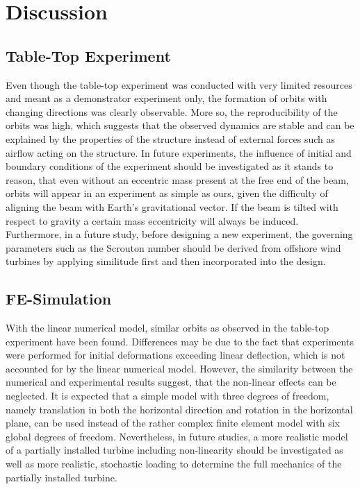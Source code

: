 \documentclass{article}
\begin{document}
\section{Discussion}
\label{sec:discussion}

\subsection{Table-Top Experiment}

Even though the table-top experiment was conducted with very limited resources and meant as a demonstrator experiment only, the formation of orbits with changing directions was clearly observable. More so, the reproducibility of the orbits was high, which suggests that the observed dynamics are stable and can be explained by the properties of the structure instead of external forces such as airflow acting on the structure. In future experiments, the influence of initial and boundary conditions of the experiment should be investigated as it stands to reason, that even without an eccentric mass present at the free end of the beam, orbits will appear in an experiment as simple as ours, given the difficulty of aligning the beam with Earth's gravitational vector. If the beam is tilted with respect to gravity a certain mass eccentricity will always be induced. Furthermore, in a future study, before designing a new experiment, the governing parameters such as the Scrouton number should be derived from offshore wind turbines by applying similitude first and then incorporated into the design. 

\subsection{FE-Simulation}

With the linear numerical model, similar orbits as observed in the table-top experiment have been found. Differences may be due to the fact that experiments were performed for initial deformations exceeding linear deflection, which is not accounted for by the linear numerical model. However, the similarity between the numerical and experimental results suggest, that the non-linear effects can be neglected. It is expected that a simple model with three degrees of freedom, namely translation in both the horizontal direction and rotation in the horizontal plane, can be used instead of the rather complex finite element model with six global degrees of freedom. Nevertheless, in future studies, a more realistic model of a partially installed turbine including non-linearity should be investigated as well as more realistic, stochastic loading to determine the full mechanics of the partially installed turbine.
\end{document}
